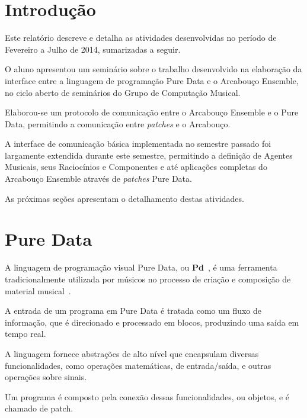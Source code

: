 \documentclass[a4paper, 11pt, twoside]{article}
\begin{document}
\begin{multicols}{2}

\section{Introdução}

Este relatório descreve e detalha as atividades desenvolvidas no período de 
Fevereiro a Julho de 2014, sumarizadas a seguir.

O aluno apresentou um seminário sobre o trabalho desenvolvido na elaboração da 
interface entre a linguagem de programação Pure Data e o Arcabouço Ensemble, 
no ciclo aberto de seminários do Grupo de Computação Musical.

Elaborou-se um protocolo de comunicação entre o Arcabouço Ensemble e o
Pure Data, permitindo a comunicação entre \textit{patches} e o Arcabouço.

A interface de comunicação básica implementada no semestre passado foi
largamente extendida durante este semestre, permitindo a definição de
Agentes Musicais, seus Raciocínios e Componentes e até aplicações
completas do Arcabouço Ensemble através de \textit{patches} Pure Data.



As próximas seções apresentam o detalhamento destas atividades.

\section{Pure Data}

A linguagem de programação visual Pure Data, ou \textbf{Pd}~\cite{puckette97}, 
é uma ferramenta tradicionalmente utilizada por músicos no processo de criação
e composição de material musical~\cite{leandro11}. 

A entrada de um programa em Pure Data é tratada como
um fluxo de informação, que é direcionado e processado
em blocos, produzindo uma saída em tempo real.

A linguagem fornece abstrações de alto nível que encapsulam
diversas funcionalidades, como operações matemáticas,
de entrada/saída, e outras operações sobre sinais.

Um programa é composto pela conexão dessas
funcionalidades, ou objetos, e é chamado de patch.


\end{multicols}
\end{document}
